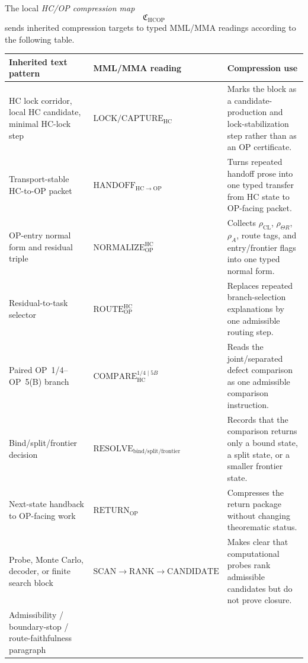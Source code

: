 \begin{definition}
\label{def:compression-map-from-inherited-text-to-mml-mma-operations}
The local \emph{HC/OP compression map}
\[
  \mathfrak C_{\mathrm{HCOP}}
\]
sends inherited compression targets to typed MML/MMA readings according to the following table.

{\small
\renewcommand{\arraystretch}{1.18}
\begin{longtable}{|p{}|p{}|p{}|}
\hline
\textbf{Inherited text pattern} & \textbf{MML/MMA reading} & \textbf{Compression use} \\
\hline
HC lock corridor, local HC candidate, minimal HC-lock step &
\(\mathrm{LOCK}/\mathrm{CAPTURE}_{\mathrm{HC}}\) &
Marks the block as a candidate-production and lock-stabilization step rather than as an OP certificate. \\
\hline
Transport-stable HC-to-OP packet &
\(\mathrm{HANDOFF}_{\mathrm{HC}\to\mathrm{OP}}\) &
Turns repeated handoff prose into one typed transfer from HC state to OP-facing packet. \\
\hline
OP-entry normal form and residual triple &
\(\mathrm{NORMALIZE}_{\mathrm{OP}}^{\mathrm{HC}}\) &
Collects \(\rho_{\mathrm{CL}}\), \(\rho_{\Theta R}\), \(\rho_A\), route tags, and entry/frontier flags into one typed normal form. \\
\hline
Residual-to-task selector &
\(\mathrm{ROUTE}_{\mathrm{OP}}^{\mathrm{HC}}\) &
Replaces repeated branch-selection explanations by one admissible routing step. \\
\hline
Paired OP~1/4--OP~5(B) branch &
\(\mathrm{COMPARE}_{\mathrm{HC}}^{1/4\mid 5B}\) &
Reads the joint/separated defect comparison as one admissible comparison instruction. \\
\hline
Bind/split/frontier decision &
\(\mathrm{RESOLVE}_{\mathrm{bind/split/frontier}}\) &
Records that the comparison returns only a bound state, a split state, or a smaller frontier state. \\
\hline
Next-state handback to OP-facing work &
\(\mathrm{RETURN}_{\mathrm{OP}}\) &
Compresses the return package without changing theorematic status. \\
\hline
Probe, Monte Carlo, decoder, or finite search block &
\(\mathrm{SCAN}\to\mathrm{RANK}\to\mathrm{CANDIDATE}\) &
Makes clear that computational probes rank admissible candidates but do not prove closure. \\
\hline
Admissibility / boundary-stop / route-faithfulness paragraph &

\end{longtable}}
\end{definition}
